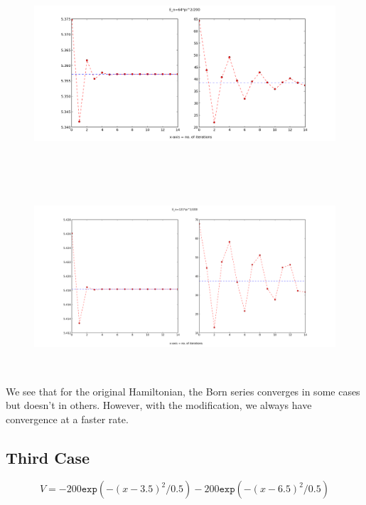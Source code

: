 \documentclass[a4paper,10pt]{report}
\begin{document}
\begin{center}
\begin{figure}[lht]
\includegraphics[width=360pt, height=200pt]{series2b.png}
\end{figure}
\end{center}

\begin{center}
\begin{figure}[lht]
\includegraphics[width=360pt, height=200pt]{series2c.png}
\end{figure}
\end{center}

We see that for the original Hamiltonian, the Born series converges in some cases but doesn't in others. However,
with the modification, we always have convergence at a faster rate.
\subsection{Third Case}
\begin{equation}\label{potentialdef3}
V = -200\mathtt{exp}(-(x-3.5)^2/0.5)-200\mathtt{exp}(-(x-6.5)^2/0.5)
\end{equation}
\end{document}
